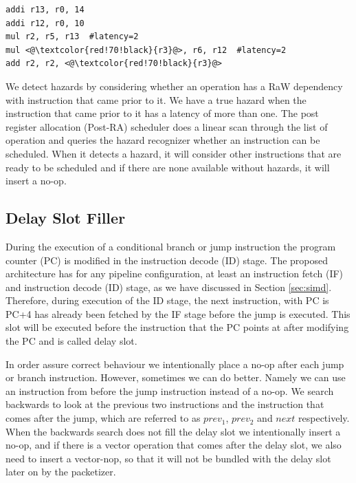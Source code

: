 \begin{lstlisting}
addi r13, r0, 14
addi r12, r0, 10
mul r2, r5, r13  #latency=2
mul <@\textcolor{red!70!black}{r3}@>, r6, r12  #latency=2
add r2, r2, <@\textcolor{red!70!black}{r3}@>
\end{lstlisting}

We detect hazards by considering whether an operation has a RaW dependency with instruction that came prior to it. We have a true hazard when the instruction that came prior to it has a latency of more than one. The post register allocation (Post-RA) scheduler does a linear scan through the list of operation and queries the hazard recognizer whether an instruction can be scheduled. When it detects a hazard, it will consider other instructions that are ready to be scheduled and if there are none available without hazards, it will insert a no-op.

\subsection{Delay Slot Filler}
During the execution of a conditional branch or jump instruction the program counter (PC) is modified in the instruction decode (ID) stage. The proposed architecture has for any pipeline configuration, at least an instruction fetch (IF) and instruction decode (ID) stage, as we have discussed in Section \ref{sec:simd}. Therefore, during execution of the ID stage, the next instruction, with PC is PC+4 has already been fetched by the IF stage before the jump is executed. This slot will be executed before the instruction that the PC points at after modifying the PC and is called delay slot. %

In order assure correct behaviour we intentionally 
place a no-op after each jump or branch instruction. However, sometimes we can do better. Namely we can use an instruction from before the jump instruction instead of a no-op. We search backwards to look at the previous two instructions and the instruction that comes after the jump, which are referred to as $prev_1$, $prev_2$ and $next$ respectively. When the backwards search does not fill the delay slot we intentionally insert a no-op, and if there is a vector operation that comes after the delay slot, we also need to insert a vector-nop, so that it will not be bundled with the delay slot later on by the packetizer.

